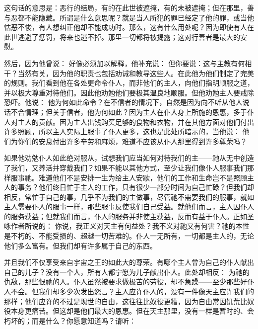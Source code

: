 这句话的意思是：恶行的结局，有的在此世被遮掩，有的未被遮掩；但在那里，善与恶都不能隐藏。所谓是什么意思呢？就是当人所犯的罪已经定了他的罪，或当他怙恶不悛，有人想纠正他却不能成功时。那么，这有什么用处呢？因为即使有人在此世逃避了惩罚，将来也逃不掉。那里一切都将被揭露；这对行善者是最大的安慰。\par

然后，因为他曾说： 好像必须加以解释，他补充说： 但你要说：这与主教有何相干？当然有关，因为他的职责也包括劝诫和教导这些人。在此他为他们制定了完美的规则。我们看到他在各处更命令仆人，而非他们的主人，向他们指明顺服之道，并以极大尊重对待他们。因此他劝勉他们要极其温良地顺服。但他劝勉主人要戒除恐吓。他说：  他为何如此命令？在不信者的情况下，自然是因为向不听从他人说话不合情理；但关于信者，他为何如此？因为主人在仆人身上所施的恩惠，多于仆人对主人的贡献。因为主人出钱购买足够的食物和衣物，并在其他方面对他们付出许多照顾，所以主人实际上服事了仆人更多，这也是此处所暗示的，当他说： 他们为你们的安息付出许多辛劳和麻烦，难道不应该从仆人那里得到许多尊荣吗？\par

 如果他劝勉仆人如此绝对服从，试想我们应当如何对待我们的主——祂从无中创造了我们，又养活并穿戴我们？如果不能以其他方式，至少让我们像仆人服事我们那样服事祂。难道他们不是安排一生为给主人安歇，他们的工作和生命岂不是照顾主人的事务？他们终日忙于主人的工作，只有很少一部分时间为自己忙碌？但我们却相反，常忙于自己的事，几乎不为我们的主做事，尽管祂不需要我们的服事，就如主人需要仆人的服事一样，那些服事反使我们自己受益。就他们而言，主人因仆人的服务获益；但就我们而言，仆人的服务并非使主获益，反而有益于仆人。正如圣咏作者所说的：  你说，我正义对天主有何益处？我不义对祂又有何害？祂的本性是不朽的、不能受损的、超越一切苦难的。仆人一无所有，一切都是主人的，无论他们多么富有。但我们却有许多属于自己的东西。\par

并且我们不仅享受来自宇宙之王的如此大的尊荣。有哪个主人曾为自己的仆人献出自己的儿子？没有一个人，所有人都宁愿为儿子献出仆人。此处却相反： 为祂的仇敌，那些恨祂的人。仆人虽然被要求做极苦的劳役，却不急躁——至少那些好仆人不会。但我们却多少次发出怨言？主人应许仆人的，没有一件像天主应许我们的那样；他们应许的不过是现世的自由，这往往比奴役更糟，因为自由常因饥荒比奴役本身更痛苦。但这却是他们最大的恩惠。但在天主那里，没有一样是暂时的、会朽坏的；而是什么？你愿意知道吗？请听： \par

